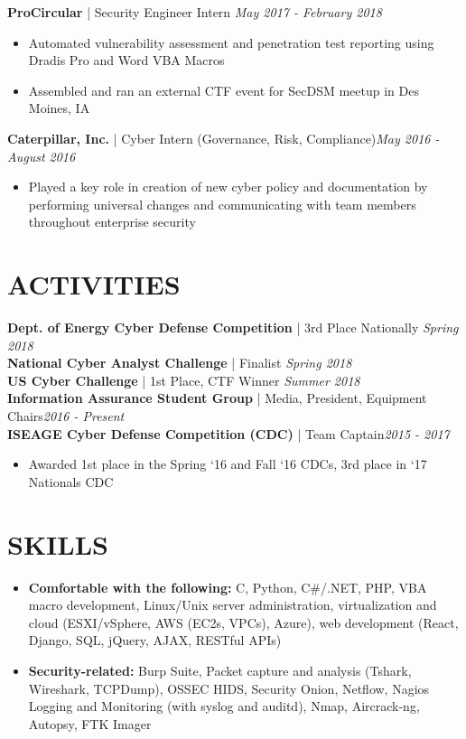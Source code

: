 \documentclass[line]{res}
\begin{document}
\begin{resume}
\textbf{ProCircular} | Security Engineer Intern \hfill \textit{May 2017 - February 2018}
\begin{itemize}
	\item Automated vulnerability assessment and penetration test reporting using Dradis Pro and Word VBA Macros
	\item Assembled and ran an external CTF event for SecDSM meetup in Des Moines, IA
\end{itemize}

\textbf{Caterpillar, Inc.} | Cyber Intern (Governance, Risk, Compliance)\hfill \textit{May 2016 - August 2016}
\begin{itemize}
	\item Played a key role in creation of new cyber policy and documentation by performing universal changes and communicating with team members throughout enterprise security
\end{itemize}

\section{ACTIVITIES}
\textbf{Dept. of Energy Cyber Defense Competition} | 3rd Place Nationally \hfill \textit{Spring 2018}\\
\textbf{National Cyber Analyst Challenge} | Finalist \hfill \textit{Spring 2018}\\
\textbf{US Cyber Challenge} | 1st Place, CTF Winner \hfill \textit{Summer 2018}\\
\textbf{Information Assurance Student Group} | Media, President, Equipment Chairs\hfill \textit{2016 - Present}\\
\textbf{ISEAGE Cyber Defense Competition (CDC)} | Team Captain\hfill \textit{2015 - 2017}
\begin{itemize}
	\item Awarded 1st place in the Spring ‘16 and Fall ‘16 CDCs, 3rd place in ‘17 Nationals CDC
\end{itemize}

\section{SKILLS}
\begin{itemize}
	\item \textbf{Comfortable with the following:} C, Python, C\#/.NET, PHP, VBA macro development, Linux/Unix server administration, virtualization and cloud (ESXI/vSphere, AWS (EC2s, VPCs), Azure), web development (React, Django, SQL, jQuery, AJAX, RESTful APIs)
	\item \textbf{Security-related:} Burp Suite, Packet capture and analysis (Tshark, Wireshark, TCPDump), OSSEC HIDS, Security Onion, Netflow, Nagios Logging and Monitoring (with syslog and auditd), Nmap, Aircrack-ng, Autopsy, FTK Imager
\end{itemize}

\end{resume}
\end{document}
